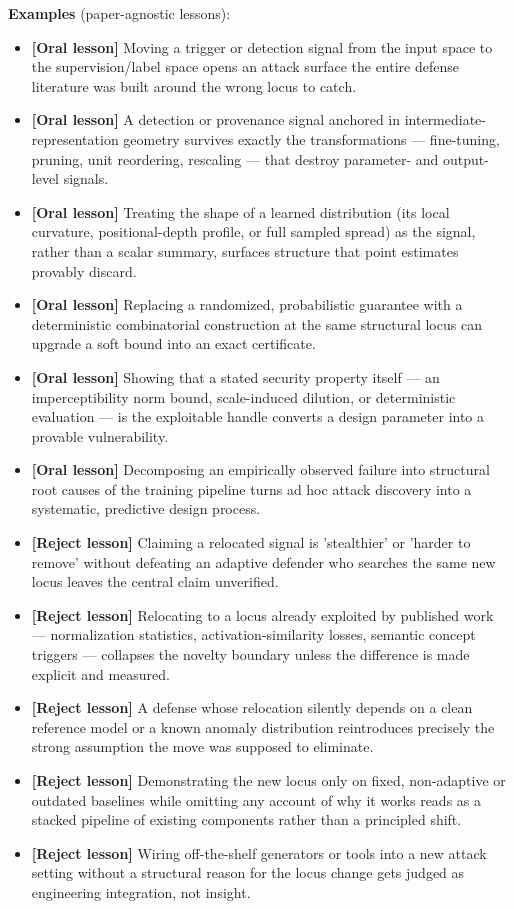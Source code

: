 \begin{tcolorbox}[colback=bgskill!50, colframe=cgreen!70, title={\textbf{C01} \textcolor{gray}{\small (O20/H9/R21)}}, breakable, before skip=4pt, after skip=4pt]
\textbf{Examples} (paper-agnostic lessons):
\begin{itemize}[leftmargin=12pt,topsep=2pt,itemsep=1pt]
  \item \textbf{[Oral lesson]} Moving a trigger or detection signal from the input space to the supervision/label space opens an attack surface the entire defense literature was built around the wrong locus to catch.
  \item \textbf{[Oral lesson]} A detection or provenance signal anchored in intermediate-representation geometry survives exactly the transformations --- fine-tuning, pruning, unit reordering, rescaling --- that destroy parameter- and output-level signals.
  \item \textbf{[Oral lesson]} Treating the shape of a learned distribution (its local curvature, positional-depth profile, or full sampled spread) as the signal, rather than a scalar summary, surfaces structure that point estimates provably discard.
  \item \textbf{[Oral lesson]} Replacing a randomized, probabilistic guarantee with a deterministic combinatorial construction at the same structural locus can upgrade a soft bound into an exact certificate.
  \item \textbf{[Oral lesson]} Showing that a stated security property itself --- an imperceptibility norm bound, scale-induced dilution, or deterministic evaluation --- is the exploitable handle converts a design parameter into a provable vulnerability.
  \item \textbf{[Oral lesson]} Decomposing an empirically observed failure into structural root causes of the training pipeline turns ad hoc attack discovery into a systematic, predictive design process.
  \item \textbf{[Reject lesson]} Claiming a relocated signal is 'stealthier' or 'harder to remove' without defeating an adaptive defender who searches the same new locus leaves the central claim unverified.
  \item \textbf{[Reject lesson]} Relocating to a locus already exploited by published work --- normalization statistics, activation-similarity losses, semantic concept triggers --- collapses the novelty boundary unless the difference is made explicit and measured.
  \item \textbf{[Reject lesson]} A defense whose relocation silently depends on a clean reference model or a known anomaly distribution reintroduces precisely the strong assumption the move was supposed to eliminate.
  \item \textbf{[Reject lesson]} Demonstrating the new locus only on fixed, non-adaptive or outdated baselines while omitting any account of why it works reads as a stacked pipeline of existing components rather than a principled shift.
  \item \textbf{[Reject lesson]} Wiring off-the-shelf generators or tools into a new attack setting without a structural reason for the locus change gets judged as engineering integration, not insight.
\end{itemize}
\end{tcolorbox}
